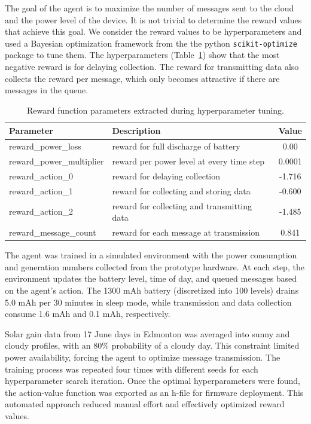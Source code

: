 \documentclass[10pt]{cai}
\begin{document}
The goal of the agent is to maximize the number of messages sent to the cloud and the power level of the device.
It is not trivial to determine the reward values that achieve this goal.
We consider the reward values to be hyperparameters and used a Bayesian optimization framework from the the python \verb|scikit-optimize| package to tune them.
The hyperparameters (Table~\ref{tab:reward_parameters}) show that the most negative reward is for delaying collection. 
The reward for transmitting data also collects the reward per message, which only becomes attractive if there are messages in the queue.

\begin{table}[h]
  \centering
  \caption{Reward function parameters extracted during hyperparameter tuning.}
  \begin{tabular}{l p{8cm} c}
      \toprule
      \textbf{Parameter} & \textbf{Description} & \textbf{Value} \\
      \midrule
      reward\_power\_loss & reward for full discharge of battery & 0.00  \\ 
      reward\_power\_multiplier & reward per power level at every time step & 0.0001  \\ 
      reward\_action\_0 & reward for delaying collection & -1.716 \\ 
      reward\_action\_1 & reward for collecting and storing data & -0.600 \\ 
      reward\_action\_2 & reward for collecting and transmitting data & -1.485 \\ 
      reward\_message\_count & reward for each message at transmission & 0.841 \\ 
      \bottomrule
  \end{tabular}
  \label{tab:reward_parameters}
\end{table}

The agent was trained in a simulated environment with the power consumption and generation numbers collected from the prototype hardware.
At each step, the environment updates the battery level, time of day, and queued messages based on the agent's action.
The 1300 mAh battery (discretized into 100 levels) drains 5.0 mAh per 30 minutes in sleep mode, while transmission and data collection consume 1.6 mAh and 0.1 mAh, respectively.

Solar gain data from 17 June days in Edmonton was averaged into sunny and cloudy profiles, with an 80\% probability of a cloudy day. 
This constraint limited power availability, forcing the agent to optimize message transmission. 
The training process was repeated four times with different seeds for each hyperparameter search iteration. 
Once the optimal hyperparameters were found, the action-value function was exported as an h-file for firmware deployment. 
This automated approach reduced manual effort and effectively optimized reward values.
\end{document}

